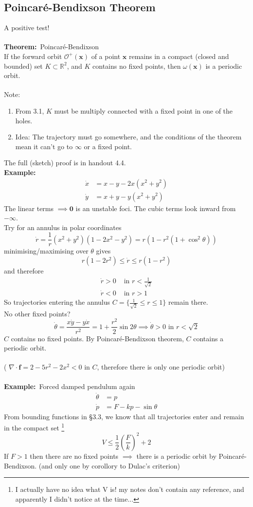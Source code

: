 \documentclass{article}
\newcommand{\cO}{\mathcal{O}}                               %
\newcommand{\example}{\textbf{Example:}}                    %
\newcommand{\theorem}{\textbf{Theorem:}}                    %
\newcommand{\bx}{\bm{x}}                                    %
\begin{document}
\subsection{Poincar\'e-Bendixson Theorem}
A positive test!
\\
\\
\theorem\ Poincar\'e-Bendixson
\\
If the forward orbit $\cO^+(\bx)$ of a point $\bx$ remains in a compact 
(closed and bounded) set $K \subset \mathbb{R}^2$, and $K$ contains no 
fixed points, then $\omega(\bx)$ is a periodic orbit.
\\
\\
Note:
\begin{enumerate}[1.]
\item From 3.1, $K$ must be multiply connected with a fixed point in one
	of the holes.
\item Idea: The trajectory must go somewhere, and the conditions of the 
	theorem mean it can't go to $\infty$ or a fixed point.
\end{enumerate}
The full (sketch) proof is in handout 4.4.\\
\example\
\begin{align*}
\dot{x} &= x - y - 2x(x^2+y^2) \\
\dot{y} &= x+y -y(x^2+y^2)
\end{align*}
The linear terms $\implies \bm{0}$ is an unstable foci. The cubic terms
look inward from $-\infty$.
\\
Try for an annulus in polar coordinates
\[ \dot{r} = \frac{1}{r}(x^2+y^2)(1-2x^2-y^2) = r(1-r^2(1+\cos^2 \theta)) \]
minimising/maximising over $\theta$ gives
\[ r(1-2r^2) \leq \dot{r} \leq r(1-r^2) \]
and therefore
\begin{align*}
\dot{r}>0 &\mbox{ in } r < \frac{1}{\sqrt{2}} \\
\dot{r}<0 &\mbox{ in } r > 1
\end{align*}
So trajectories entering the annulus $C = \{ \frac{1}{\sqrt{2}} \leq r \leq 1 \}$
remain there.
\\
No other fixed points?
\[\dot{\theta} = \frac{x \dot{y} - y \dot{x}}{r^2} = 1 + \frac{r^2}{2} \sin
2\theta \implies \dot{\theta} > 0 \mbox{ in } r < \sqrt{2} \]
$C$ contains no fixed points. By Poincar\'e-Bendixson theorem, $C$ contains a
periodic orbit.
\\
\\
( $\nabla \cdot \bm{f} = 2 - 5r^2 -2x^2 <0$ in $C$, therefore there is
only one periodic orbit)
\\
\\
\example\ Forced damped pendulum again
\begin{align*}
\dot{\theta} &= p \\
\dot{p}      &= F - kp - \sin \theta
\end{align*}
From bounding functions in \S 3.3, we know that all trajectories enter
and remain in the compact set
\footnote{I actually have no idea what V is! my notes don't contain any 
reference, and apparently I didn't notice at the time...}
\[ V \leq \frac{1}{2} \left(\frac{F}{k} \right)^2 +2\]
If $F>1$ then there are no fixed points $\implies$ there is a periodic
orbit by Poincar\'e-Bendixson. (and only one by corollory to Dulac's
criterion)
\\
\end{document}
